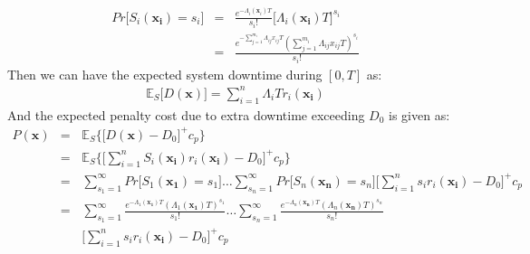 \documentclass[preprint,12pt]{elsarticle}
\begin{document}
\begin {eqnarray}
Pr\bigg[S_{i}(\boldsymbol{x_i})=s_{i}\bigg]&=&\frac{e^{-\Lambda_{i}(\boldsymbol x_{i})T}}{s_{i}!}{\bigg[\Lambda_{i}(\boldsymbol{x_{i}})T\bigg]}^{s_{i}} \nonumber\\
&=& \frac{e^{-\sum_{j=1}^{m_{i}}{\Lambda_{ij}x_{ij}T}}(\sum_{j=1}^{m_{i}}{\Lambda_{ij}x_{ij}T})^{s_{i}}}{s_{i}!}
\end {eqnarray}
Then we can have the expected system downtime during $[0, T]$ as:
\begin{eqnarray}
\mathbb{E}_{S}\bigg[D(\boldsymbol{x})\bigg]=\sum_{i=1}^{n}{\Lambda_{i}T r_{i}(\boldsymbol{x_{i}})}
\end{eqnarray}
And the expected penalty cost due to extra downtime exceeding $D_0$ is given as:
\begin{eqnarray}
P(\boldsymbol{x}) & = & \mathbb{E}_{S}\bigg\{\bigg[D(\boldsymbol{x})-D_{0}\bigg]^{+} c_{p} \bigg\} \nonumber\\
&=& \mathbb{E}_{S}\bigg\{\bigg[\sum_{i=1}^{n}{S_{i}(\boldsymbol{x_{i}})r_{i}(\boldsymbol{x_i})}-D_{0}\bigg]^{+} c_{p} \bigg\} \nonumber\\
&=& \sum_{s_{1}=1}^{\infty}{Pr\bigg[S_{1}(\boldsymbol{x_{1}})=s_{1}\bigg]}\dots\sum_{s_{n}=1}^{\infty}{Pr\bigg[S_{n}(\boldsymbol{x_{n}})=s_{n}\bigg]}{\bigg[\sum_{i=1}^{n}{s_{i}r_{i}(\boldsymbol{x_i})}-D_{0}\bigg]^{+}c_{p}} \nonumber\\
&=& \sum_{s_{1}=1}^{\infty}{\frac{e^{-\Lambda_{1}(\boldsymbol{x_{1}})T}(\Lambda_{1}(\boldsymbol{x_{1}})T)^{s_{1}}}{s_{1}!}}\dots\sum_{s_{n}=1}^{\infty}{\frac{e^{-\Lambda_{n}(\boldsymbol{x_{n}})T}(\Lambda_{n}(\boldsymbol{x_{n}})T)^{s_{n}}}{s_{n}!}} \nonumber\\
&  \  \  \   \       &\bigg[\sum_{i=1}^{n}s_{i}r_{i}(\boldsymbol{x_i})-D_{0}\bigg]^{+}c_{p}
\end{eqnarray}
\end{document}
